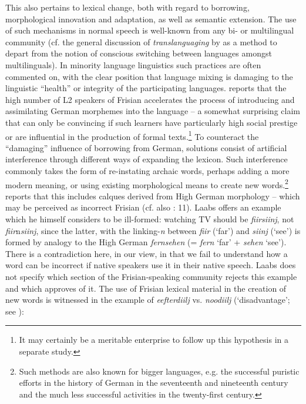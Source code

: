 \documentclass[output=paper]{langsci/langscibook}
\begin{document}
This also pertains to lexical change, both with regard to borrowing, morphological innovation and adaptation, as well as semantic extension. The use of such mechanisms in normal speech is well-known from any bi- or multilingual community (cf. the general discussion of \textit{translanguaging} by \citealt{GarciaWei2014} as a method to depart from the notion of conscious switching between languages amongst multilinguals). In minority language linguistics such practices are often commented on, with the clear position that language mixing is damaging to the linguistic “health” or integrity of the participating languages. \citet[38]{Laabs2009} reports that the high number of L2 speakers of Frisian accelerates the process of introducing and assimilating German morphemes into the language – a somewhat surprising claim that can only be convincing if such learners have particularly high social prestige or are influential in the production of formal texts.\footnote{It may certainly be a meritable enterprise to follow up this hypothesis in a separate study.} To counteract the “damaging” influence of borrowing from German, solutions consist of artificial interference through different ways of expanding the lexicon. Such interference commonly takes the form of re-instating archaic words, perhaps adding a more modern meaning, or using existing morphological means to create new words.\footnote{Such methods are also known for bigger languages, e.g. the successful puristic efforts in the history of German in the seventeenth and nineteenth century and the much less successful activities in the twenty-first century.} \citet[37f]{Laabs2009} reports that this includes calques derived from High German morphology – which may be perceived as incorrect Frisian (cf. also \citealt{Ebert1994}: 11). Laabs offers an example which he himself considers to be ill-formed: watching TV should be \textit{fiirsiinj}, not \textit{fiir}n\textit{siinj}, since the latter, with the linking-\textit{n} between \textit{fiir} (‘far’) and \textit{siinj} (‘see’) is formed by analogy to the High German \textit{fernsehen} (= \textit{fern} ‘far’ + \textit{sehen} ‘see’). There is a contradiction here, in our view, in that we fail to understand how a word can be incorrect if native speakers use it in their native speech. Laabs does not specify which section of the Frisian-speaking community rejects this example and which approves of it. The use of Frisian lexical material in the creation of new words is witnessed in the example of \textit{eefterdiilj} vs. \textit{noodiilj} (‘disadvantage’; see ):
\end{document}
